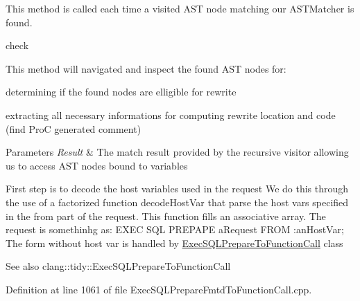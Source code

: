This method is called each time a visited A\+ST node matching our A\+S\+T\+Matcher is found. 

check

This method will navigated and inspect the found A\+ST nodes for\+:
\begin{DoxyItemize}
\item determining if the found nodes are elligible for rewrite
\item extracting all necessary informations for computing rewrite location and code (find ProC generated comment)
\end{DoxyItemize}


\begin{DoxyParams}{Parameters}
{\em Result} & The match result provided by the recursive visitor allowing us to access A\+ST nodes bound to variables \\
\hline
\end{DoxyParams}
First step is to decode the host variables used in the request We do this through the use of a factorized function decode\+Host\+Var that parse the host vars specified in the from part of the request. This function fills an associative array. The request is somethinhg as\+: E\+X\+EC S\+QL P\+R\+E\+P\+A\+PE a\+Request F\+R\+OM \+:an\+Host\+Var; The form without host var is handled by \hyperlink{classclang_1_1tidy_1_1pagesjaunes_1_1_exec_s_q_l_prepare_to_function_call}{Exec\+S\+Q\+L\+Prepare\+To\+Function\+Call} class

\begin{DoxySeeAlso}{See also}
clang\+::tidy\+::\+Exec\+S\+Q\+L\+Prepare\+To\+Function\+Call
\end{DoxySeeAlso}


Definition at line 1061 of file Exec\+S\+Q\+L\+Prepare\+Fmtd\+To\+Function\+Call.\+cpp.

